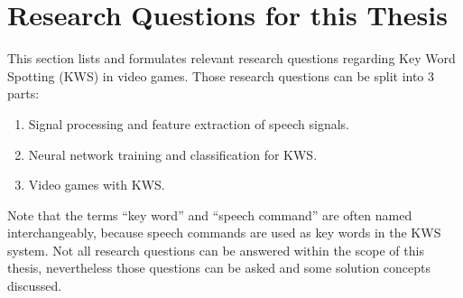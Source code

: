 
\section{Research Questions for this Thesis}\label{sec:intro_rq}
\thesisStateRevised
This section lists and formulates relevant research questions regarding Key Word Spotting (KWS) in video games.
Those research questions can be split into 3 parts:
\begin{enumerate}[label={Q.\arabic*)}, leftmargin=1.4cm]
  \item Signal processing and feature extraction of speech signals.
  \item Neural network training and classification for KWS.
  \item Video games with KWS.
\end{enumerate}
Note that the terms \enquote{key word} and \enquote{speech command} are often named interchangeably, because speech commands are used as key words in the KWS system.
Not all research questions can be answered within the scope of this thesis, nevertheless those questions can be asked and some solution concepts discussed.



